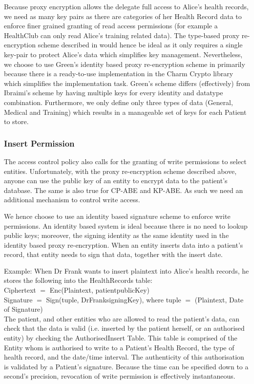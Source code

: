 \documentclass[]{article}
\begin{document}
Because proxy encryption allows the delegate full access to Alice's health records, we need as many key pairs as there are categories of her Health Record data to enforce finer grained granting of read access permissions (for example a HealthClub can only read Alice's training related data). The type-based proxy re-encryption scheme described in \cite{ibraimi2008type} would hence be ideal as it only requires a single key-pair to protect Alice's data which simplifies key management. Nevertheless, we choose to use Green's identity based proxy re-encryption scheme in \cite{green2007identity} primarily because there is a ready-to-use implementation in the Charm Crypto library \cite{charm13} which simplifies the implementation task. Green's scheme differs (effectively) from Ibraimi's scheme by having multiple keys for every identity and datatype combination. Furthermore, we only define only three types of data (General, Medical and Training) which results in a manageable set of keys for each Patient to store.

\subsubsection{Insert Permission}
The access control policy also calls for the granting of write permissions to select entities. Unfortunately, with the proxy re-encryption scheme described above, anyone can use the public key of an entity to encrypt data to the patient's database. The same is also true for CP-ABE and KP-ABE. As such we need an additional mechanism to control write access.

We hence choose to use an identity based signature scheme \cite{waters2005efficient} to enforce write permissions. An identity based system is ideal because there is no need to lookup public keys; moreover, the signing identity as the same identity used in the identity based proxy re-encryption. When an entity inserts data into a patient's record, that entity needs to sign that data, together with the insert date.

Example:
When Dr Frank wants to insert plaintext into Alice's health records, he stores the following into the HealthRecords table:\\
Ciphertext $=$ Enc(Plaintext, patientpublicKey)\\
Signature $=$ Sign(tuple, DrFranksigningKey), where tuple $=$ (Plaintext, Date of Signature)\\

The patient, and other entities who are allowed to read the patient's data, can check that the data is valid (i.e. inserted by the patient herself, or an authorised entity) by checking the AuthorisedInsert Table. This table is comprised of the Entity whom is authorised to write to a Patient's Health Record, the type of health record, and the date/time interval. The authenticity of this authorisation is validated by a Patient's signature. Because the time can be specified down to a second's precision, revocation of write permission is effectively instantaneous.
\end{document}
